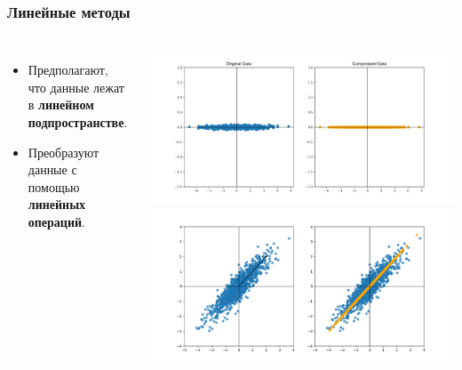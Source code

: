 \begin{frame}
    \frametitle{Линейные методы}
    \begin{columns}
        \begin{itemize}
            \item Предполагают, что данные лежат в \textbf{линейном подпространстве}.
            \item Преобразуют данные с помощью \textbf{линейных операций}.
        \end{itemize}
        \begin{center}
            \includegraphics[width=.9\textwidth]{../resources/pca/simple_example_both.png}
            \includegraphics[width=.9\textwidth]{../resources/methods/pca.png}
        \end{center}
    \end{columns}
\end{frame}

